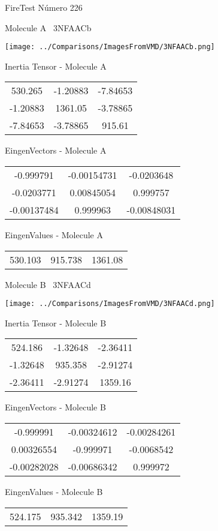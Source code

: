 \vtab[-3cm]
\begin{center}
{\large FireTest \tab Número 226}
\end{center}
\begin{multicols}{2}
\begin{center}

Molecule A \
3NFAACb

\texttt{[image: ../Comparisons/ImagesFromVMD/3NFAACb.png]}

Inertia Tensor - Molecule A \\
\begin{tabular}{|c c c|}
530.265	 & 	-1.20883	 & 	-7.84653	 \\
-1.20883	 & 	1361.05	 & 	-3.78865	 \\
-7.84653	 & 	-3.78865	 & 	915.61
\end{tabular}

\vtab
 EingenVectors - Molecule A     \\
\begin{tabular}{|c c c|}
-0.999791	 & 	-0.00154731	 & 	-0.0203648	 \\
-0.0203771	 & 	0.00845054	 & 	0.999757	 \\
-0.00137484	 & 	0.999963	 & 	-0.00848031
\end{tabular}

\vtab
 EingenValues - Molecule A     \\
\begin{tabular}{|c c c|}
530.103	 & 	915.738	 & 	1361.08	 \\
\end{tabular}
\columnbreak

Molecule B \
3NFAACd

\texttt{[image: ../Comparisons/ImagesFromVMD/3NFAACd.png]}

Inertia Tensor - Molecule B \\
\begin{tabular}{|c c c|}
524.186	 & 	-1.32648	 & 	-2.36411	 \\
-1.32648	 & 	935.358	 & 	-2.91274	 \\
-2.36411	 & 	-2.91274	 & 	1359.16
\end{tabular}

\vtab
 EingenVectors - Molecule B     \\
\begin{tabular}{|c c c|}
-0.999991	 & 	-0.00324612	 & 	-0.00284261	 \\
0.00326554	 & 	-0.999971	 & 	-0.0068542	 \\
-0.00282028	 & 	-0.00686342	 & 	0.999972
\end{tabular}

\vtab
 EingenValues - Molecule B     \\
\begin{tabular}{|c c c|}
524.175	 & 	935.342	 & 	1359.19	 \\
\end{tabular}

\end{center}
\end{multicols}

